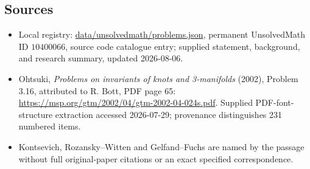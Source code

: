 \documentclass[11pt]{article}
\begin{document}
\subsection{Sources}
\begin{itemize}
\item Local registry: \url{data/unsolvedmath/problems.json}, permanent UnsolvedMath ID \(10400066\), source code catalogue entry; supplied statement, background, and research summary, updated 2026-08-06.
\item Ohtsuki, \emph{Problems on invariants of knots and 3-manifolds} (2002), Problem 3.16, attributed to R. Bott, PDF page 65: \url{https://msp.org/gtm/2002/04/gtm-2002-04-024s.pdf}. Supplied PDF-font-structure extraction accessed 2026-07-29; provenance distinguishes 231 numbered items.
\item Kontsevich, Rozansky--Witten and Gelfand--Fuchs are named by the passage without full original-paper citations or an exact specified correspondence.
\end{itemize}
\end{document}
